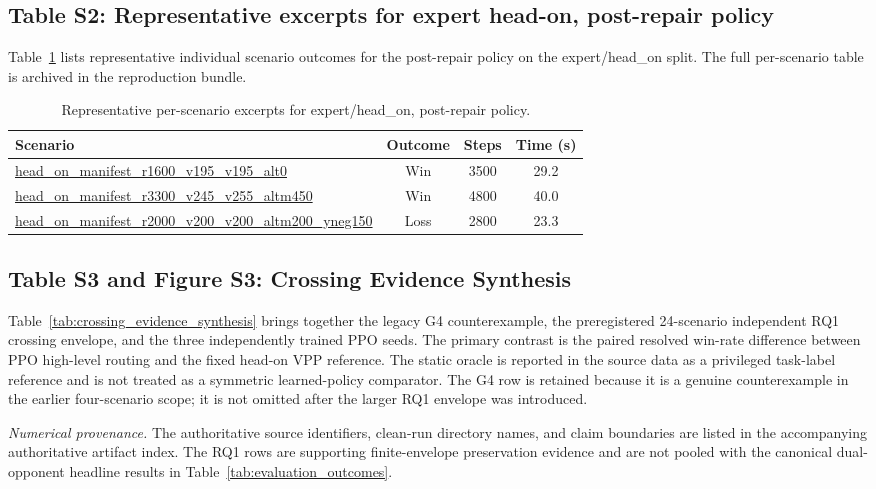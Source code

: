 \documentclass[12pt,a4paper]{article}
\begin{document}
\subsection{Table S2: Representative excerpts for expert head-on, post-repair policy}

Table~\ref{tab:scenario_breakdown} lists representative individual scenario outcomes for the post-repair policy on the expert/head\_on split. The full per-scenario table is archived in the reproduction bundle.

\begin{table}[htbp]
\centering
\caption{Representative per-scenario excerpts for expert/head\_on, post-repair policy.}
\label{tab:scenario_breakdown}
\begin{tabular}{@{}>{\raggedright\arraybackslash}p{7.5cm}ccc@{}}
\toprule
Scenario & Outcome & Steps & Time (s) \\
\midrule
\url{head_on_manifest_r1600_v195_v195_alt0} & Win & 3500 & 29.2 \\
\url{head_on_manifest_r3300_v245_v255_altm450} & Win & 4800 & 40.0 \\
\url{head_on_manifest_r2000_v200_v200_altm200_yneg150} & Loss & 2800 & 23.3 \\
\bottomrule
\end{tabular}
\end{table}

\subsection{Table S3 and Figure S3: Crossing Evidence Synthesis}

Table~\ref{tab:crossing_evidence_synthesis} brings together the legacy G4
counterexample, the preregistered 24-scenario independent RQ1 crossing
envelope, and the three independently trained PPO seeds. The primary contrast
is the paired resolved win-rate difference between PPO high-level routing and
the fixed head-on VPP reference. The static oracle is reported in the source
data as a privileged task-label reference and is not treated as a symmetric
learned-policy comparator. The G4 row is retained because it is a genuine
counterexample in the earlier four-scenario scope; it is not omitted after the
larger RQ1 envelope was introduced.

\noindent\textit{Numerical provenance.} The authoritative source identifiers,
clean-run directory names, and claim boundaries are listed in the accompanying
authoritative artifact index. The RQ1 rows are
supporting finite-envelope preservation evidence and are not pooled with the
canonical dual-opponent headline results in Table~\ref{tab:evaluation_outcomes}.
\end{document}
